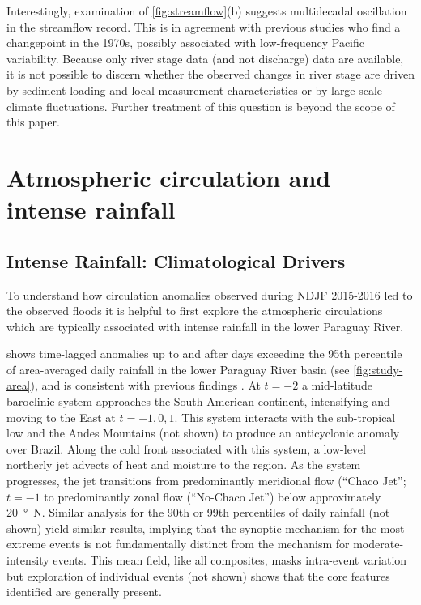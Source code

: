 \documentclass[twocol]{ametsoc}
\begin{document}
Interestingly, examination of \cref{fig:streamflow}(b) suggests multidecadal oscillation in the streamflow record.
This is in agreement with previous studies \citep{Collischonn:2001bi,Carvalho2011} who find a changepoint in the 1970s, possibly associated with low-frequency Pacific variability.
Because only river stage data (and not discharge) data are available, it is not possible to discern whether the observed changes in river stage are driven by sediment loading and local measurement characteristics or by large-scale climate fluctuations.
Further treatment of this question is beyond the scope of this paper.


\section{Atmospheric circulation and intense rainfall} \label{sec:diagnostics}

\subsection{Intense Rainfall: Climatological Drivers} \label{sec:rainfall-circulation}

To understand how circulation anomalies observed during NDJF 2015-2016 led to the observed floods it is helpful to first explore the atmospheric circulations which are typically associated with intense rainfall in the lower Paraguay River.

 shows time-lagged anomalies up to and after days exceeding the 95th percentile of area-averaged daily rainfall in the lower Paraguay River basin (see \cref{fig:study-area}), and is consistent with previous findings \citep{Marengo2004,Salio:2007gd}.
At $t=-2$ a mid-latitude baroclinic system approaches the South American continent, intensifying and moving to the East at $t=-1,0,1$.
This system interacts with the sub-tropical low and the Andes Mountains (not shown) to produce an anticyclonic anomaly over Brazil.
Along the cold front associated with this system, a low-level northerly jet advects of heat and moisture to the region.
As the system progresses, the jet transitions from predominantly meridional flow (``Chaco Jet''; $t=-1$ to predominantly zonal flow (``No-Chaco Jet'') below approximately \SI{20}{\degree N}.
Similar analysis for the 90th or 99th percentiles of daily rainfall (not shown) yield similar results, implying that the synoptic mechanism for the most extreme events is not fundamentally distinct from the mechanism for moderate-intensity events.
This mean field, like all composites, masks intra-event variation but exploration of individual events (not shown) shows that the core features identified are generally present.
\end{document}
